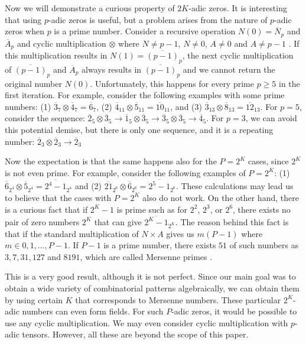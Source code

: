 \documentclass[times,twocolumn,final]{elsarticle}
\begin{document}
Now we will demonstrate a curious property of $2K$-adic zeros. It is interesting that using $p$-adic zeros is useful, but a problem arises from the nature of $p$-adic zeros when $p$ is a prime number. Consider a recursive operation $N(0)=\overline{N}_{p}$ and $\overline{A}_{p}$ and cyclic multiplication $\otimes$ where $N\neq p-1$, $N\neq 0$, $A\neq 0$ and $A\neq p-1$ . If this multiplication results in $N(1)=\overline{(p-1)}_{p}$, the next cyclic multiplication of $\overline{(p-1)}_{p}$ and $\overline{A}_{p}$ always results in $\overline{(p-1)}_{p}$ and we cannot return the original number $N(0)$. Unfortunately, this happens for every prime $p \geq 5$ in the first iteration. For example, consider the following examples with some prime numbers: (1) $\overline{3}_{7} \otimes \overline{4}_{7} = \overline{6}_{7}$, (2) $\overline{4}_{11} \otimes \overline{5}_{11} = \overline{10}_{11}$, and (3) $\overline{3}_{13} \otimes \overline{8}_{13} = \overline{12}_{13}$. 
For $p=5$, consider the sequence: $\overline{2}_{5} \otimes \overline{3}_{5} \rightarrow \overline{1}_{5} \otimes \overline{3}_{5}  \rightarrow \overline{3}_{5} \otimes \overline{3}_{5} \rightarrow \overline{4}_{5} $. For $p=3$, we can avoid this potential demise, but there is only one sequence, and it is a repeating number: $\overline{2}_{3} \otimes  \overline{2}_{3}  \rightarrow \overline{2}_{3} $  


Now the expectation is that the same happens also for the $P=2^K$ cases, since $2^K$ is not even prime. For example, consider the following examples of $P=2^K$: (1) $\overline{6}_{2^4} \otimes \overline{5}_{2^4} = \overline{2^4-1}_{2^4}$ and (2) $\overline{21}_{2^6} \otimes \overline{6}_{2^6} = \overline{2^5-1}_{2^6}$. These calculations may lead us to believe that the cases with $P=2^K$ also do not work. On the other hand, there is a curious fact that if $2^K-1$ is prime such as for $2^2$, $2^3$, or $2^6$, there exists no pair of zero numbers $2^K$ that can give $\overline{2^K-1}_{2^K}$. The reason behind this fact is that if the standard multiplication of $N \times A $ gives us $m (P -1)$ where $m \in {0,1,\ldots, P-1}$. If $P -1$ is a prime number, there exists $51$ of such numbers as $3, 7, 31, 127$ and $8191$, which are called Mersenne primes \cite{gillies1964three}. 

This is a very good result, although it is not perfect. Since our main goal was to obtain a wide variety of combinatorial patterns algebraically, we can obtain them by using certain $K$ that corresponds to Mersenne numbers. These particular $2^K$-adic numbers can even form fields. For such $P$-adic zeros, it would be possible to use any cyclic multiplication. We may even consider cyclic multiplication with $p$-adic tensors. However, all these are beyond the scope of this paper. 
\end{document}
